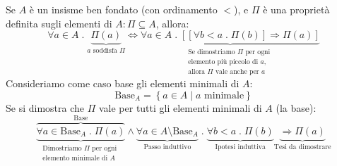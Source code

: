 \documentclass[a4paper]{article}
\begin{document}
\begin{definition}
  Se \( A \) è un insisme ben fondato (con ordinamento \( < \)), e \( \Pi  \) è una
  proprietà definita sugli elementi di \( A: \Pi \subseteq A \), allora:
  \[
    \forall  a \in A \;.\; \underbrace{\Pi(a) }_{a\text{ soddisfa } \Pi} \iff
    \underbrace{
      \forall a \in A \;.\; \left[ \left[ \forall b < a \;.\; \Pi(b) \right] \Rightarrow
      \Pi(a)\right]
    }_{
      \substack{
        \text{Se dimostriamo } \Pi \text{ per ogni }\\
        \text{elemento più piccolo di } a, \\
        \text{allora } \Pi \text{ vale anche per } a
      }
    }
  \] 
  Consideriamo come caso base gli elementi minimali di \( A \):
  \[
    \text{Base}_A = \left\{ a \in A \;\left|\; a \text{ minimale}  \right.\right\}
  \] 
  Se si dimostra che \( \Pi \) vale per tutti gli elementi minimali di \( A \) (la base):
  \[
    \overbrace{
      \underbrace{
        \forall a \in \text{Base}_A \;.\; \Pi(a)
      }_{
        \substack{
          \text{Dimostriamo } \Pi \text{ per ogni }\\
          \text{elemento minimale di } A
        }
      }
    }^{\text{Base}}
    \wedge 
    \underbrace{
      \forall a \in A \setminus \text{Base}_A
    }_{
      \text{Passo induttivo}
    }
    \;.\;
    \underbrace{
      \forall b < a \;.\; \Pi(b)
    }_{
      \text{Ipotesi induttiva}
    }
    \underbrace{
      \Rightarrow \Pi(a)
    }_{
      \text{Tesi da dimostrare}
    }
  \] 
\end{definition}
\end{document}
